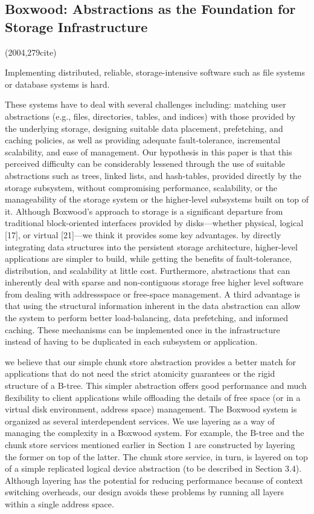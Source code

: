 \documentclass[a4paper,twoside]{scrbook}
\begin{document}
\subsection{Boxwood: Abstractions as the Foundation for Storage Infrastructure \cite{maccormick2004boxwood}}
(2004,279cite)\par
Implementing distributed, reliable, storage-intensive software such as file systems or database systems is hard.\par
These systems have to deal with several challenges including: matching user abstractions (e.g., files, directories, tables, and indices) with those provided by the underlying storage, designing suitable data placement, prefetching, and caching policies, as well as providing adequate fault-tolerance, incremental scalability, and ease of management.
Our hypothesis in this paper is that this perceived difficulty can be considerably lessened through the use of suitable abstractions such as trees, linked lists, and hash-tables, provided directly by the storage subsystem, without compromising performance, scalability, or the manageability of the storage system or the higher-level subsystems built on top of it.
Although Boxwood’s approach to storage is a significant departure from traditional block-oriented interfaces provided by disks—whether physical, logical [17], or virtual [21]—we think it provides some key advantages.
by directly integrating data structures into the persistent storage architecture, higher-level applications are simpler to build, while getting the benefits of fault-tolerance, distribution, and scalability at little cost. Furthermore, abstractions that can inherently deal with sparse and non-contiguous storage free higher level software from dealing with addressspace or free-space management. 
A third advantage is that using the structural information inherent in the data abstraction can allow the system to perform better load-balancing, data prefetching, and informed caching. These mechanisms can be implemented once in the infrastructure instead of having to be duplicated in each subsystem or application.

we believe that our simple chunk store abstraction provides a better match for applications that do not need the strict atomicity guarantees or the rigid structure of a B-tree. This simpler abstraction offers good performance and much flexibility to client applications while offloading the details of free space (or in a virtual disk environment, address space) management.
The Boxwood system is organized as several interdependent services. We use layering as a way of managing the complexity in a Boxwood system. For example, the B-tree and the chunk store services mentioned earlier in Section 1 are constructed by layering the former on top of the latter. The chunk store service, in turn, is layered on top of a simple replicated logical device abstraction (to be described in Section 3.4). Although layering has the potential for reducing performance because of context switching overheads, our design avoids these problems by running all layers within a single address space.
\end{document}
